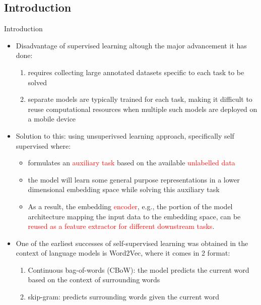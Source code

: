 \documentclass{Beamer}
\begin{document}
\subsection{Introduction}
\begin{frame}[t,allowframebreaks]{Introduction}


\begin{itemize}

\item Disadvantage of supervised learning altough the major advancement it has done:


\begin{enumerate}
\item requires collecting
large annotated datasets specific to each task to be solved

\item separate models are typically trained for each task,
making it difficult to reuse computational resources when
multiple such models are deployed on a mobile device
\end{enumerate}

\item Solution to this: using unsuperivsed learning approach, specifically self supervised where:

	\begin{itemize}
	\item formulates an \textcolor{red}{auxiliary task} based on the available \textcolor{red}{unlabelled data}
	
	\item the model will learn some general purpose representations in a lower dimensional embedding space while solving this auxiliary task 
	
	\item As a result, the embedding
\textcolor{red}{encoder}, e.g., the portion of the model architecture mapping the input data to the embedding space, can be \textcolor{red}{reused as a feature extractor for different downstream tasks}.
	\end{itemize}

\item One of the earliest successes of self-supervised learning
was obtained in the context of language models is Word2Vec, where it comes in 2 format:
	\begin{enumerate}
	\item Continuous bag-of-words (CBoW): the model predicts the current word based on the context of surrounding words
	
	\item skip-gram: predicts surrounding words given the current word
	\end{enumerate}

\end{itemize}


\end{frame}
\end{document}
